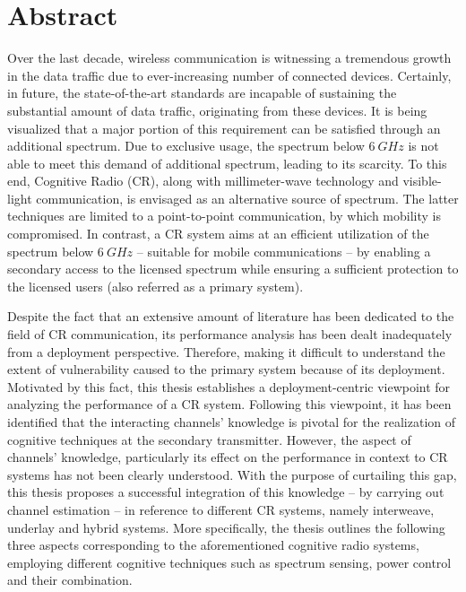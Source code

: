 
\chapter*{Abstract}
Over the last decade, wireless communication is witnessing a tremendous growth in the data traffic due to ever-increasing number of connected devices. Certainly, in future, the state-of-the-art standards are incapable of sustaining the substantial amount of data traffic, originating from these devices. It is being visualized that a major portion of this requirement can be satisfied through an additional spectrum. Due to exclusive usage, the spectrum below $\SI{6}{GHz}$ is not able to meet this demand of additional spectrum, leading to its scarcity. To this end, Cognitive Radio (CR), along with millimeter-wave technology and visible-light communication, is envisaged as an alternative source of spectrum. The latter techniques are limited to a point-to-point communication, by which mobility is compromised. In contrast, a CR system aims at an efficient utilization of the spectrum below $\SI{6}{GHz}$ -- suitable for mobile communications -- by enabling a secondary access to the licensed spectrum while ensuring a sufficient protection to the licensed users (also referred as a primary system). %


Despite the fact that an extensive amount of literature has been dedicated to the field of CR communication, its performance analysis has been dealt inadequately from a deployment perspective. Therefore, making it difficult to understand the extent of vulnerability caused to the primary system because of its deployment. Motivated by this fact, this thesis establishes a deployment-centric viewpoint for analyzing the performance of a CR system. Following this viewpoint, it has been identified that the interacting channels' knowledge is pivotal for the realization of cognitive techniques at the secondary transmitter. However, the aspect of channels' knowledge, particularly its effect on the performance in context to CR systems has not been clearly understood. With the purpose of curtailing this gap, this thesis proposes a successful integration of this knowledge -- by carrying out channel estimation -- in reference to different CR systems, namely interweave, underlay and hybrid systems. More specifically, the thesis outlines the following three aspects corresponding to the aforementioned cognitive radio systems, employing different cognitive techniques such as spectrum sensing, power control and their combination.

